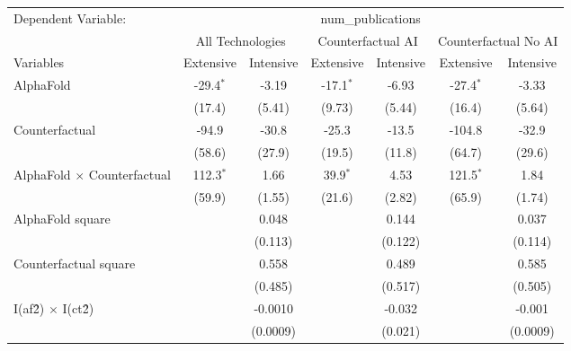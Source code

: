 \begingroup
\centering
\begin{tabular}{lcccccc}
   \tabularnewline \midrule \midrule
   Dependent Variable: & \multicolumn{6}{c}{num\_publications}\\
 & \multicolumn{2}{c}{All Technologies} & \multicolumn{2}{c}{Counterfactual AI} & \multicolumn{2}{c}{Counterfactual No AI} \\
\cmidrule(lr){1-1}\cmidrule(lr){2-3} \cmidrule(lr){4-5} \cmidrule(lr){6-7}
Variables & \multicolumn{1}{c}{Extensive} & \multicolumn{1}{c}{Intensive} & \multicolumn{1}{c}{Extensive} & \multicolumn{1}{c}{Intensive} & \multicolumn{1}{c}{Extensive} & \multicolumn{1}{c}{Intensive} \\
\cmidrule(lr){1-1}\cmidrule(lr){2-2} \cmidrule(lr){3-3} \cmidrule(lr){4-4} \cmidrule(lr){5-5} \cmidrule(lr){6-6} \cmidrule(lr){7-7}
   AlphaFold                          & -29.4$^{*}$ & -3.19    & -17.1$^{*}$ & -6.93   & -27.4$^{*}$ & -3.33\\   
                                      & (17.4)      & (5.41)   & (9.73)      & (5.44)  & (16.4)      & (5.64)\\   
   Counterfactual                     & -94.9       & -30.8    & -25.3       & -13.5   & -104.8      & -32.9\\   
                                      & (58.6)      & (27.9)   & (19.5)      & (11.8)  & (64.7)      & (29.6)\\   
   AlphaFold $\times$ Counterfactual  & 112.3$^{*}$ & 1.66     & 39.9$^{*}$  & 4.53    & 121.5$^{*}$ & 1.84\\   
                                      & (59.9)      & (1.55)   & (21.6)      & (2.82)  & (65.9)      & (1.74)\\   
   AlphaFold square                   &             & 0.048    &             & 0.144   &             & 0.037\\   
                                      &             & (0.113)  &             & (0.122) &             & (0.114)\\   
   Counterfactual square              &             & 0.558    &             & 0.489   &             & 0.585\\   
                                      &             & (0.485)  &             & (0.517) &             & (0.505)\\   
   I(af\^2) $\times$ I(ct\^2)         &             & -0.0010  &             & -0.032  &             & -0.001\\   
                                      &             & (0.0009) &             & (0.021) &             & (0.0009)\\   

\end{tabular}

